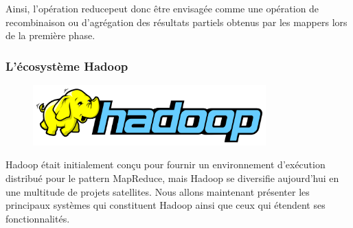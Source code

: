 \documentclass[12pt]{article}
\begin{document}
Ainsi, l’opération \og reduce\fg  peut donc être envisagée comme une opération de recombinaison ou d'agrégation des résultats partiels obtenus par les mappers lors de la première phase.
\subsubsection{L'écosystème Hadoop}
\begin{figure}[H]
\centering
\includegraphics[width=0.8\textwidth]{hadoop}
\end{figure}
Hadoop était initialement conçu pour fournir un environnement d'exécution distribué pour le pattern MapReduce, mais Hadoop se diversifie aujourd'hui en une multitude de projets satellites. Nous allons maintenant présenter les principaux systèmes qui constituent Hadoop ainsi que ceux qui étendent ses fonctionnalités.
\end{document}
